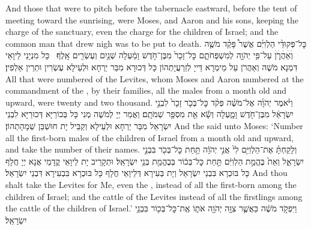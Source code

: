 {And those that were to pitch before the tabernacle eastward, before the tent of meeting toward the sunrising, were Moses, and Aaron and his sons, keeping the charge of the sanctuary, even the charge for the children of Israel; and the common man that drew nigh was to be put to death.}{}
{כׇּל־פְּקוּדֵ֨י הַלְוִיִּ֜ם אֲשֶׁר֩ פָּקַ֨ד מֹשֶׁ֧ה וְׄאַׄהֲׄרֹ֛ׄןׄ עַל־פִּ֥י יְהֹוָ֖ה לְמִשְׁפְּחֹתָ֑ם כׇּל־זָכָר֙ מִבֶּן־חֹ֣דֶשׁ וָמַ֔עְלָה שְׁנַ֥יִם וְעֶשְׂרִ֖ים אָֽלֶף׃ \setuma 
{}}
{כָּל מִנְיָנֵי לֵיוָאֵי דִּמְנָא מֹשֶׁה וְאַהֲרֹן עַל מֵימְרָא דַּייָ לְזַרְעֲיָתְהוֹן כָּל דְּכוּרָא מִבַּר יַרְחָא וּלְעֵילָא עֶשְׂרִין וּתְרֵין אַלְפִין׃}
{All that were numbered of the Levites, whom Moses and Aaron numbered at the commandment of the \lord, by their families, all the males from a month old and upward, were twenty and two thousand.}{}
{וַיֹּ֨אמֶר יְהֹוָ֜ה אֶל־מֹשֶׁ֗ה פְּקֹ֨ד כׇּל־בְּכֹ֤ר זָכָר֙ לִבְנֵ֣י יִשְׂרָאֵ֔ל מִבֶּן־חֹ֖דֶשׁ וָמָ֑עְלָה וְשָׂ֕א אֵ֖ת מִסְפַּ֥ר שְׁמֹתָֽם׃
}
{וַאֲמַר יְיָ לְמֹשֶׁה מְנִי כָּל בְּכוֹרַיָּא דְּכוּרַיָּא לִבְנֵי יִשְׂרָאֵל מִבַּר יַרְחָא וּלְעֵילָא וְקַבֵּיל יָת חוּשְׁבַּן שְׁמָהָתְהוֹן׃}
{And the \lord\space said unto Moses: ‘Number all the first-born males of the children of Israel from a month old and upward, and take the number of their names.}{}
{וְלָקַחְתָּ֨ אֶת־הַלְוִיִּ֥ם לִי֙ אֲנִ֣י יְהֹוָ֔ה תַּ֥חַת כׇּל־בְּכֹ֖ר בִּבְנֵ֣י יִשְׂרָאֵ֑ל וְאֵת֙ בֶּהֱמַ֣ת הַלְוִיִּ֔ם תַּ֣חַת כׇּל־בְּכ֔וֹר בְּבֶהֱמַ֖ת בְּנֵ֥י יִשְׂרָאֵֽל׃}
{וּתְקָרֵיב יָת לֵיוָאֵי קֳדָמַי אֲנָא יְיָ חֲלָף כָּל בּוּכְרָא בִּבְנֵי יִשְׂרָאֵל וְיָת בְּעִירָא דְּלֵיוָאֵי חֲלָף כָּל בּוּכְרָא בִּבְעִירָא דִּבְנֵי יִשְׂרָאֵל׃}
{And thou shalt take the Levites for Me, even the \lord, instead of all the first-born among the children of Israel; and the cattle of the Levites instead of all the firstlings among the cattle of the children of Israel.’}{}
{וַיִּפְקֹ֣ד מֹשֶׁ֔ה כַּאֲשֶׁ֛ר צִוָּ֥ה יְהֹוָ֖ה אֹת֑וֹ אֶֽת־כׇּל־בְּכ֖וֹר בִּבְנֵ֥י יִשְׂרָאֵֽל׃}
